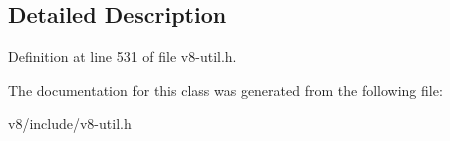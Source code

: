 \subsection{Detailed Description}


Definition at line 531 of file v8-\/util.\+h.



The documentation for this class was generated from the following file\+:\begin{DoxyCompactItemize}
\item 
v8/include/v8-\/util.\+h\end{DoxyCompactItemize}
